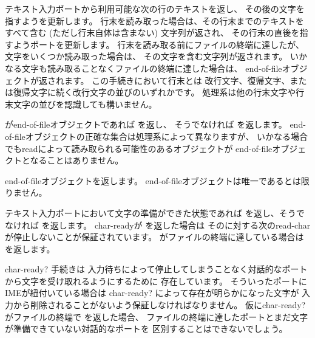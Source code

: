 \begin{entry}{%
}

テキスト入力ポートから利用可能な次の行のテキストを返し、
その後の文字を指すようを更新します。
行末を読み取った場合は、その行末までのテキストをすべて含む
(ただし行末自体は含まない) 文字列が返され、
その行末の直後を指すようポートを更新します。
行末を読み取る前にファイルの終端に達したが、
文字をいくつか読み取った場合は、
その文字を含む文字列が返されます。
いかなる文字も読み取ることなくファイルの終端に達した場合は、
end-of-fileオブジェクトが返されます。
この手続きにおいて行末とは
改行文字、復帰文字、または復帰文字に続く改行文字の並びのいずれかです。
処理系は他の行末文字や行末文字の並びを認識しても構いません。

\end{entry}


\begin{entry}{%
}

がend-of-fileオブジェクトであれば \schtrue{}を返し、
そうでなければ \schfalse{}を返します。
end-of-fileオブジェクトの正確な集合は処理系によって異なりますが、
いかなる場合でも{\cf read}によって読み取られる可能性のあるオブジェクトが
end-of-fileオブジェクトとなることはありません。

\end{entry}

\begin{entry}{%
}

end-of-fileオブジェクトを返します。
end-of-fileオブジェクトは唯一であるとは限りません。

\end{entry}


\begin{entry}{%
}

テキスト入力ポートにおいて文字の準備ができた状態であれば %
\schtrue{}を返し、そうでなければ \schfalse{}を返します。
{\cf char-ready}が \schtrue{}を返した場合は
そのに対する次の{\cf read-char}が停止しないことが保証されています。
がファイルの終端に達している場合は \schtrue{}を返します。

\begin{rationale}
{\cf char-ready?} 手続きは
入力待ちによって停止してしまうことなく対話的なポートから文字を受け取れるようにするために
存在しています。
そういったポートにIMEが紐付いている場合は
{\cf char-ready?} によって存在が明らかになった文字が
入力から削除されることがないよう保証しなければなりません。
仮に{\cf char-ready?} がファイルの終端で \schfalse{}を返した場合、
ファイルの終端に達したポートとまだ文字が準備できていない対話的なポートを
区別することはできないでしょう。
\end{rationale}
\end{entry}

